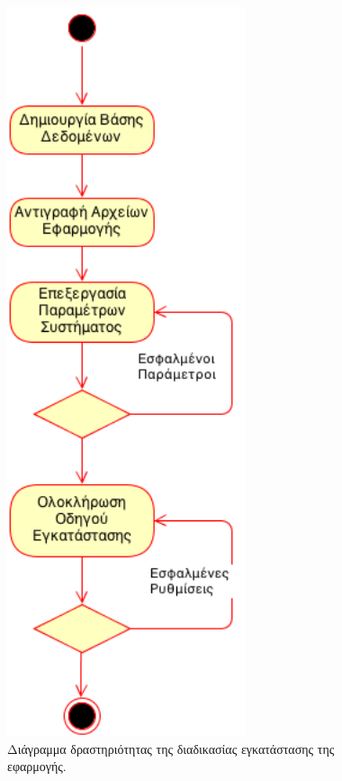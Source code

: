 \begin{figure}
\centering
\includegraphics[width=70mm]{images/ad-install-application.png}
\caption{Διάγραμμα δραστηριότητας της διαδικασίας εγκατάστασης της εφαρμογής.}
\label{ad-install-application}
\end{figure}

